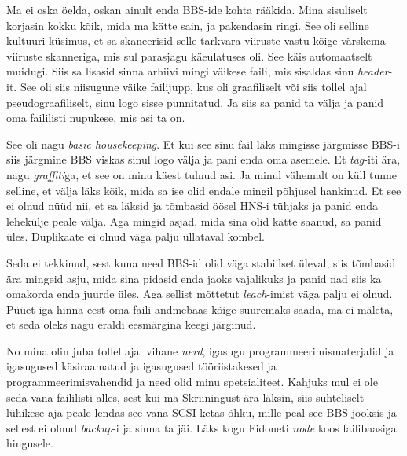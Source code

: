 
Ma ei oska öelda, oskan ainult enda BBS-ide kohta rääkida. Mina 
sisuliselt korjasin kokku kõik, mida ma kätte sain, ja pakendasin ringi. See 
oli selline kultuuri küsimus, et sa skaneerisid selle tarkvara viiruste vastu 
kõige värskema viiruste skanneriga, mis sul parasjagu käeulatuses oli. See käis 
automaatselt muidugi. Siis sa lisasid sinna arhiivi mingi väikese faili, 
mis sisaldas sinu \emph{header}-it. See oli siis niisugune väike 
failijupp, kus oli graafiliselt või siis tollel ajal pseudograafiliselt, sinu 
logo sisse punnitatud. Ja siis sa panid ta välja ja panid oma faililisti 
nupukese, mis asi ta on. 

See oli nagu \emph{basic housekeeping}. Et kui see sinu fail läks mingisse 
järgmisse BBS-i siis järgmine BBS viskas sinul logo välja ja pani enda oma 
asemele. Et \emph{tag}-iti ära, nagu \emph{graffiti}ga, et see on 
minu käest tulnud asi. Ja minul vähemalt on küll tunne selline, et välja läks 
kõik, mida sa ise olid endale mingil põhjusel hankinud. Et see ei olnud nüüd 
nii, et sa läksid ja tõmbasid öösel HNS-i tühjaks ja 
panid enda lehekülje peale välja. Aga mingid asjad, mida sina olid kätte 
saanud, sa panid üles. Duplikaate ei olnud väga palju üllataval kombel.


Seda ei tekkinud, sest kuna need BBS-id olid väga stabiilset üleval, siis 
tõmbasid ära mingeid asju, mida sina pidasid enda jaoks vajalikuks ja panid nad 
siis ka omakorda enda juurde üles. Aga sellist mõttetut \emph{leach}-imist  
väga 
palju ei olnud. Püüet iga hinna eest oma faili andmebaas kõige suuremaks saada, 
ma ei mäleta, et seda oleks nagu eraldi eesmärgina keegi järginud. 


No mina olin juba tollel ajal vihane \emph{nerd}, igasugu 
programmeerimismaterjalid ja igasugused käsiraamatud ja igasugused 
tööriistakesed ja  programmeerimisvahendid ja need olid minu spetsialiteet. 
Kahjuks mul ei ole seda vana faililisti alles, sest kui ma Skriiningust ära 
läksin, siis suhteliselt lühikese aja peale lendas see vana SCSI ketas õhku, 
mille peal see BBS jooksis ja sellest ei olnud \emph{backup}-i ja sinna ta jäi. 
Läks kogu Fidoneti \emph{node} koos failibaasiga hingusele.

